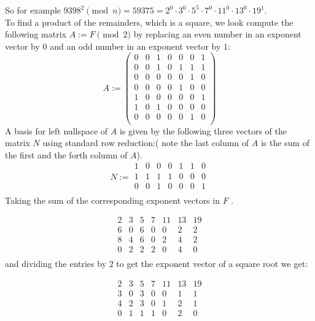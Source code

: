 \documentclass{report}
\begin{document}
So for example $9398^2 \pmod{n} = 59375 = 2^0 \cdot 3^0 \cdot 5^5 \cdot 7^0
\cdot 11^0 \cdot 13^0 \cdot 19^1$. \\
To find a product of the remainders, which is a square, we look  compute
the following matrix $A := F \pmod{2}$ by replacing an even number in an exponent vector by
$0$ and an odd number in an exponent vector by $1$:
\[
 A := \left(\begin{array}{rrrrrrr}
  0 & 0 & 1 & 0 & 0 & 0 &  1 \\
  0 & 0 & 1 & 0 & 1 & 1 &  1 \\
  0 & 0 & 0 & 0 & 0 & 1 &  0 \\
  0 & 0 & 0 & 0 & 1 & 0 &  0 \\
  1 & 0 & 0 & 0 & 0 & 0 &  1 \\
  1 & 0 & 1 & 0 & 0 & 0 &  0 \\
  0 & 0 & 0 & 0 & 0 & 1 &  0 \\
\end{array}\right)
\]
A basis for left nullspace of $A$  is given by the following three vectors
of the matrix $N$
using standard row reduction:( note the last column of $A$ is  the sum of the first and  the forth column of $A$).
\[
N:= \begin{array}{rrrrrrr}
  1 & 0 & 0 & 0 & 1 & 1 & 0 \\
  1 & 1 & 1 & 1 & 0 & 0 & 0 \\
  0 & 0 & 1 & 0 & 0 & 0 & 1 \\ 
 \end{array}
\]
Taking the sum of the corresponding exponent vectors in $F$ .

\[
 \begin{array}{rrrrrrr}
   2 & 3 & 5 & 7 & 11 & 13 & 19 \\ \hline
6 & 0 & 6 & 0 & 0 & 2 & 2 \\
8 & 4 & 6 & 0 & 2 & 4 & 2 \\ 
0 & 2 & 2 & 2 & 0 & 4 & 0 \\
\end{array}
\]
and dividing the entries by $2$ to get the exponent vector of a square root
we get:

\[
 \begin{array}{rrrrrrr}
   2 & 3 & 5 & 7 & 11 & 13 & 19 \\ \hline
3 & 0 & 3 & 0 & 0 & 1 & 1 \\
4 & 2 & 3 & 0 & 1 & 2 & 1  \\
0 & 1 & 1 & 1 & 0 & 2 & 0 \\
\end{array}
\]
\end{document}
